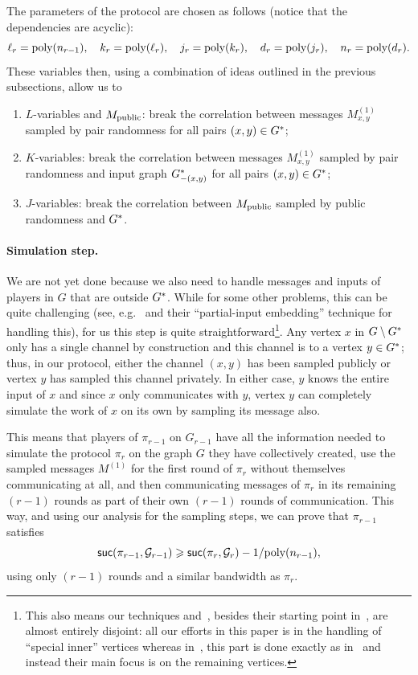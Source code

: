 \documentclass[11pt]{article}
\theoremstyle{definition}
\renewcommand{\geq}{\geqslant}
\newcommand{\poly}{\mbox{\rm poly}}
\newcommand{\prot}{\ensuremath{\pi}}
\newcommand{\suc}{\ensuremath{\textnormal{\textsf{suc}}}}
\begin{document}
The parameters of the protocol are chosen as follows (notice that the dependencies are acyclic): 
\[
\ell_r = \poly(n_{r-1}), \quad k_r = \poly(\ell_r), \quad j_r = \poly(k_r), \quad d_r = \poly(j_r), \quad n_r = \poly(d_r).  
\]
These variables then, using a combination of ideas outlined in the previous subsections, allow us to
\begin{enumerate}
	\item $L$-variables and $M_{\textnormal{public}}$: break the correlation between messages $M^{(1)}_{x,y}$ sampled by pair randomness for all pairs $(x,y) \in G^*$; 
	\item $K$-variables: break the correlation between messages $M^{(1)}_{x,y}$ sampled by pair randomness and input graph $G^*_{-(x,y)}$ for all pairs $(x,y) \in G^*$; 
	\item $J$-variables: break the correlation between $M_{\textnormal{public}}$ sampled by public randomness and $G^*$. 
\end{enumerate}

\paragraph{Simulation step.} We are not yet done because we also need to handle messages and inputs of players in $G$ that are outside $G^*$. While for some other problems, this can be quite challenging (see, e.g.~\cite{AssadiKZ22} and their
``partial-input embedding'' technique for handling this), for us this step is quite straightforward\footnote{This also means our techniques and~\cite{AssadiKZ22}, besides their starting point in~\cite{AlonNRW15}, are almost entirely disjoint: all our efforts in this paper is in the handling of ``special inner'' vertices whereas in~\cite{AssadiKZ22}, this part is done exactly as in~\cite{AlonNRW15} and instead their main focus is on the
	remaining vertices.}. Any vertex $x$ in $G \setminus G^*$ only has a single channel by construction and this channel is to a vertex $y \in G^*$; thus, in our protocol, 
either the channel $(x,y)$ has been sampled publicly or vertex $y$ has sampled this channel privately. In either case, $y$ knows the entire input of $x$ and since $x$ only communicates with $y$, vertex $y$ can completely simulate the work of $x$ on its own by sampling
its message also. 

This means that players of $\prot_{r-1}$ on $G_{r-1}$ have all the information needed to simulate the protocol $\prot_r$ on the graph $G$ they have collectively created, use the sampled messages $M^{(1)}$ for the first round of $\prot_r$ without themselves
communicating at all, and then communicating messages of $\prot_r$ in its remaining $(r-1)$ rounds as part of their own $(r-1)$ rounds of communication. This way, and using our analysis for the sampling steps, we can prove that $\prot_{r-1}$ satisfies
\[
\suc(\prot_{r-1},\GG_{r-1}) \geq \suc(\prot_r,\GG_r) - 1/\poly(n_{r-1}),
\]
using only $(r-1)$ rounds and a similar bandwidth as $\prot_r$. 
\end{document}

